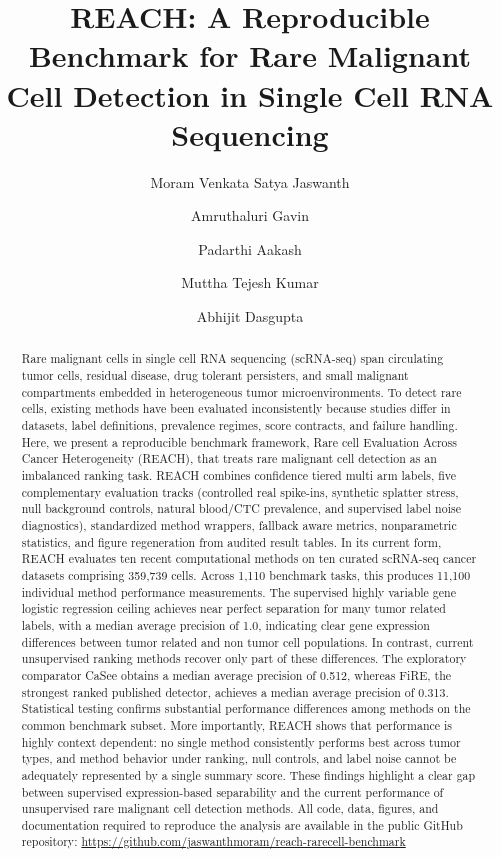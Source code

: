 \documentclass[10pt]{article}
\title{\textbf{REACH: A Reproducible Benchmark for Rare Malignant Cell
Detection in Single Cell RNA Sequencing}}
\author[1]{Moram Venkata Satya Jaswanth}
\author[1]{Amruthaluri Gavin}
\author[1]{Padarthi Aakash}
\author[1]{Muttha Tejesh Kumar}
\author[1,*]{Abhijit Dasgupta}
\affil[1]{Department of Computer Science and Engineering, SRM University, Andhra Pradesh, India}
\affil[*]{Correspondence: abhijitju06@gmail.com or abhijit.d@srmap.edu.in}
\date{}
\begin{document}
\maketitle

\begin{abstract}
\noindent
Rare malignant cells in single cell RNA sequencing (scRNA-seq) span
circulating tumor cells, residual disease, drug tolerant persisters, and
small malignant compartments embedded in heterogeneous tumor
microenvironments. To detect rare cells, existing methods have been evaluated inconsistently because
studies differ in datasets, label definitions, prevalence regimes, score
contracts, and failure handling. Here, we present a reproducible
benchmark framework,  Rare cell Evaluation Across Cancer Heterogeneity (REACH),  that treats rare malignant cell detection as an
imbalanced ranking task. REACH combines confidence tiered multi arm labels,
five complementary evaluation tracks (controlled real spike-ins, synthetic
splatter stress, null background controls, natural blood/CTC prevalence, and
supervised label noise diagnostics), standardized method wrappers, fallback aware
metrics, nonparametric statistics, and figure regeneration from audited
result tables. In its current form, REACH evaluates ten recent computational methods on ten curated scRNA-seq cancer datasets comprising 359,739 cells. Across 1,110 benchmark tasks, this produces 11,100 individual method performance measurements. The supervised highly variable gene logistic regression ceiling achieves near perfect separation for many tumor related labels, with a median average precision of 1.0, indicating clear gene expression differences between tumor related and non tumor cell populations. In contrast, current unsupervised ranking methods recover only part of these differences. The exploratory comparator CaSee obtains a median average precision of 0.512, whereas FiRE, the strongest ranked published detector, achieves a median average precision of 0.313. Statistical testing confirms substantial performance differences among methods on the common benchmark subset. More importantly, REACH shows that performance is highly context dependent: no single method consistently performs best across tumor types, and method behavior under ranking, null controls, and label noise cannot be adequately represented by a single summary score. These findings highlight a clear gap between supervised expression-based separability and the current performance of unsupervised rare malignant cell detection methods. All code, data, figures, and documentation required to reproduce the analysis are available in the public GitHub repository: \url{https://github.com/jaswanthmoram/reach-rarecell-benchmark}
\end{abstract}
\end{document}
